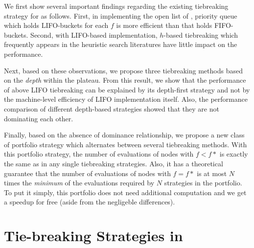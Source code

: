 We first show several important findings regarding the
existing tiebreaking strategy for \astar as follows.
% 
First, in implementing the open list of \astar, priority queue which holds
LIFO-buckets for each $f$ is more efficient than that holds FIFO-buckets.
% 
Second, with LIFO-based implementation, $h$-based tiebreaking which
frequently appears in the heuristic search literatures have little
impact on the performance.
% 

Next, based on these observations, we propose three tiebreaking methods
based on the \emph{depth} within the plateau.  From this result, we show
that the performance of above LIFO tiebreaking can be explained by its
depth-first strategy and not by the machine-level efficiency of LIFO
implementation itself.  Also, the performance comparison of different
depth-based strategies showed that they are not dominating each other.

Finally, based on the absence of dominance relationship, we propose a
new class of portfolio strategy which alternates between several
tiebreaking methods.
% 
With this portfolio strategy,
the number of evaluations of nodes with $f<f*$ is exactly the same as
in any single tiebreaking strategies.
Also, it has a theoretical guarantee that
the number of evaluations of nodes with $f=f*$ is at most $N$ times the \emph{minimum} 
of the evaluations required by $N$ strategies in the portfolio.
To put it simply, this portfolio does not need additional computation
and we get a speedup for free (aside from the negligeble differences).




\section{Tie-breaking Strategies in \astar}


